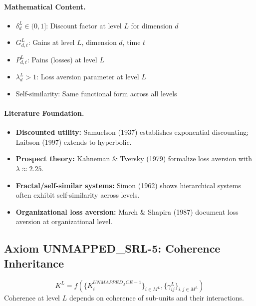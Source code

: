 \paragraph{Mathematical Content.}
\begin{itemize}
\item $\delta^L_d \in (0,1]$: Discount factor at level $L$ for dimension $d$
\item $G^L_{d,t}$: Gains at level $L$, dimension $d$, time $t$
\item $P^L_{d,t}$: Pains (losses) at level $L$
\item $\lambda^L_d > 1$: Loss aversion parameter at level $L$
\item Self-similarity: Same functional form across all levels
\end{itemize}

\paragraph{Literature Foundation.}
\begin{itemize}
\item \textbf{Discounted utility:} Samuelson (1937) establishes exponential 
discounting; Laibson (1997) extends to hyperbolic.
\item \textbf{Prospect theory:} Kahneman \& Tversky (1979) formalize loss 
aversion with $\lambda \approx 2.25$.
\item \textbf{Fractal/self-similar systems:} Simon (1962) shows hierarchical 
systems often exhibit self-similarity across levels.
\item \textbf{Organizational loss aversion:} March \& Shapira (1987) document 
loss aversion at organizational level.
\end{itemize}

\subsection{Axiom UNMAPPED_SRL-5: Coherence Inheritance}

\begin{tcolorbox}[colback=gray!5!white, colframe=gray!75!black, title=Axiom UNMAPPED_SRL-5: Coherence Inheritance]
\begin{equation}
\boxed{
K^L = f\left( \{K^{UNMAPPED_ACE-1}_i\}_{i \in M^L}, \{\gamma^L_{ij}\}_{i,j \in M^L} \right)
}
\end{equation}
Coherence at level $L$ depends on coherence of sub-units and their interactions.
\end{tcolorbox}

